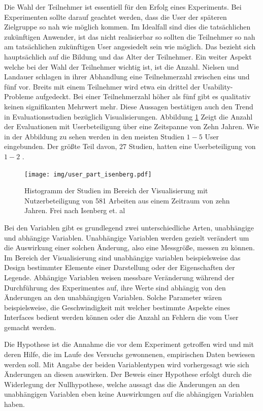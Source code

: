 \documentclass[draft=false
              ,paper=a4
              ,twoside=false
              ,fontsize=11pt
              ,headsepline
              ,BCOR10mm
              ,DIV11
              ]{scrbook}
\begin{document}
Die Wahl der Teilnehmer ist essentiell für den Erfolg eines Experiments. Bei Experimenten sollte darauf geachtet werden, dass die User der späteren Zielgruppe so nah wie möglich kommen. Im Idealfall sind dies die tatsächlichen zukünftigen Anwender, ist das nicht realisierbar so sollten die Teilnehmer so nah am tatsächlichen zukünftigen User angesiedelt sein wie möglich. Das bezieht sich hauptsächlich auf die Bildung und das Alter der Teilnehmer. Ein weiter Aspekt welche bei der Wahl der Teilnehmer wichtig ist, ist die Anzahl. Nielsen und Landauer \cite{nielsen_mathematical_1993} schlagen in ihrer Abhandlung eine Teilnehmerzahl zwischen eins und fünf vor. Breits mit einem Teilnehmer wird etwa ein drittel der Usability-Probleme aufgedeckt. Bei einer Teilnehmerzahl höher als fünf gibt es qualitativ keinen signifikanten Mehrwert mehr. Diese Aussagen bestätigen auch den Trend in Evaluationsstudien bezüglich Visualisierungen. Abbildung \ref{fig:no_of_users} Zeigt die Anzahl der Evaluationen mit Userbeteiligung über eine Zeitspanne von Zehn Jahren. Wie in der Abbildung zu sehen werden in den meisten Studien $1 - 5$ User eingebunden. Der größte Teil davon, 27 Studien, hatten eine Userbeteiligung von $1 - 2$ \cite{isenberg_systematic_2013}. 

\begin{figure}[htbp]
  \centering
  \texttt{[image: img/user\_part\_isenberg.pdf]}
  \caption{Histogramm der Studien im Bereich der Visualisierung mit Nutzerbeteiligung von 581 Arbeiten aus einem Zeitraum von zehn Jahren. Frei nach Isenberg et. al \cite{isenberg_systematic_2013}}
  \label{fig:no_of_users}
\end{figure}

Bei den Variablen gibt es grundlegend zwei unterschiedliche Arten, unabhängige und abhängige Variablen. Unabhängige Variablen werden gezielt verändert um die Auswirkung einer solchen Änderung, also eine Messgröße, messen zu können. Im Bereich der Visualisierung sind unabhängige variablen beispielsweise das Design bestimmter Elemente einer Darstellung oder der Eigenschaften der Legende. Abhängige Variablen weisen messbare Veränderung während der Durchführung des Experimentes auf, ihre Werte sind abhängig von den Änderungen an den unabhängigen Variablen. Solche Parameter wären beispielsweise, die Geschwindigkeit mit welcher bestimmte Aspekte eines Interfaces bedient werden können oder die Anzahl an Fehlern die vom User gemacht werden. 

Die Hypothese ist die Annahme die vor dem Experiment getroffen wird und mit deren Hilfe, die im Laufe des Versuchs gewonnenen, empirischen Daten bewiesen werden soll. Mit Angabe der beiden Variablentypen wird vorhergesagt wie sich Änderungen an diesen auswirken. Der Beweis einer Hypothese erfolgt durch die Widerlegung der Nullhypothese, welche aussagt das die Änderungen an den unabhängigen Variablen eben keine Auswirkungen auf die abhängigen Variablen haben. 
\end{document}
